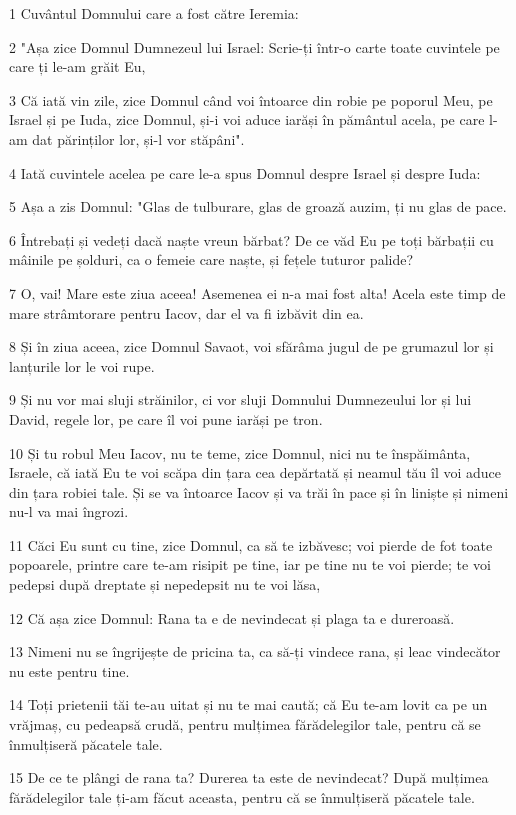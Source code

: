 \par 1 Cuvântul Domnului care a fost către Ieremia:
\par 2 "Așa zice Domnul Dumnezeul lui Israel: Scrie-ți într-o carte toate cuvintele pe care ți le-am grăit Eu,
\par 3 Că iată vin zile, zice Domnul când voi întoarce din robie pe poporul Meu, pe Israel și pe Iuda, zice Domnul, și-i voi aduce iarăși în pământul acela, pe care l-am dat părinților lor, și-l vor stăpâni".
\par 4 Iată cuvintele acelea pe care le-a spus Domnul despre Israel și despre Iuda:
\par 5 Așa a zis Domnul: "Glas de tulburare, glas de groază auzim, ți nu glas de pace.
\par 6 Întrebați și vedeți dacă naște vreun bărbat? De ce văd Eu pe toți bărbații cu mâinile pe șolduri, ca o femeie care naște, și fețele tuturor palide?
\par 7 O, vai! Mare este ziua aceea! Asemenea ei n-a mai fost alta! Acela este timp de mare strâmtorare pentru Iacov, dar el va fi izbăvit din ea.
\par 8 Și în ziua aceea, zice Domnul Savaot, voi sfărâma jugul de pe grumazul lor și lanțurile lor le voi rupe.
\par 9 Și nu vor mai sluji străinilor, ci vor sluji Domnului Dumnezeului lor și lui David, regele lor, pe care îl voi pune iarăși pe tron.
\par 10 Și tu robul Meu Iacov, nu te teme, zice Domnul, nici nu te înspăimânta, Israele, că iată Eu te voi scăpa din țara cea depărtată și neamul tău îl voi aduce din țara robiei tale. Și se va întoarce Iacov și va trăi în pace și în liniște și nimeni nu-l va mai îngrozi.
\par 11 Căci Eu sunt cu tine, zice Domnul, ca să te izbăvesc; voi pierde de fot toate popoarele, printre care te-am risipit pe tine, iar pe tine nu te voi pierde; te voi pedepsi după dreptate și nepedepsit nu te voi lăsa,
\par 12 Că așa zice Domnul: Rana ta e de nevindecat și plaga ta e dureroasă.
\par 13 Nimeni nu se îngrijește de pricina ta, ca să-ți vindece rana, și leac vindecător nu este pentru tine.
\par 14 Toți prietenii tăi te-au uitat și nu te mai caută; că Eu te-am lovit ca pe un vrăjmaș, cu pedeapsă crudă, pentru mulțimea fărădelegilor tale, pentru că se înmulțiseră păcatele tale.
\par 15 De ce te plângi de rana ta? Durerea ta este de nevindecat? După mulțimea fărădelegilor tale ți-am făcut aceasta, pentru că se înmulțiseră păcatele tale.
